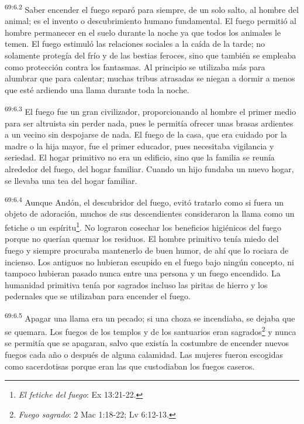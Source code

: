 \par
\textsuperscript{69:6.2} Saber encender el fuego separó para siempre, de un solo salto, al hombre del animal; es el invento o descubrimiento humano fundamental. El fuego permitió al hombre permanecer en el suelo durante la noche ya que todos los animales le temen. El fuego estimuló las relaciones sociales a la caída de la tarde; no solamente protegía del frío y de las bestias feroces, sino que también se empleaba como protección contra los fantasmas. Al principio se utilizaba más para alumbrar que para calentar; muchas tribus atrasadas se niegan a dormir a menos que esté ardiendo una llama durante toda la noche.

\par
\textsuperscript{69:6.3} El fuego fue un gran civilizador, proporcionando al hombre el primer medio para ser altruista sin perder nada, pues le permitía ofrecer unas brasas ardientes a un vecino sin despojarse de nada. El fuego de la casa, que era cuidado por la madre o la hija mayor, fue el primer educador, pues necesitaba vigilancia y seriedad. El hogar primitivo no era un edificio, sino que la familia se reunía alrededor del fuego, del hogar familiar. Cuando un hijo fundaba un nuevo hogar, se llevaba una tea del hogar familiar.

\par
\textsuperscript{69:6.4} Aunque Andón, el descubridor del fuego, evitó tratarlo como si fuera un objeto de adoración, muchos de sus descendientes consideraron la llama como un fetiche o un espíritu\footnote{\textit{El fetiche del fuego}: Ex 13:21-22.}. No lograron cosechar los beneficios higiénicos del fuego porque no querían quemar los residuos. El hombre primitivo tenía miedo del fuego y siempre procuraba mantenerlo de buen humor, de ahí que lo rociara de incienso. Los antiguos no hubieran escupido en el fuego bajo ningún concepto, ni tampoco hubieran pasado nunca entre una persona y un fuego encendido. La humanidad primitiva tenía por sagrados incluso las piritas de hierro y los pedernales que se utilizaban para encender el fuego.

\par
\textsuperscript{69:6.5} Apagar una llama era un pecado; si una choza se incendiaba, se dejaba que se quemara. Los fuegos de los templos y de los santuarios eran sagrados\footnote{\textit{Fuego sagrado}: 2 Mac 1:18-22; Lv 6:12-13.} y nunca se permitía que se apagaran, salvo que existía la costumbre de encender nuevos fuegos cada año o después de alguna calamidad. Las mujeres fueron escogidas como sacerdotisas porque eran las que custodiaban los fuegos caseros.

